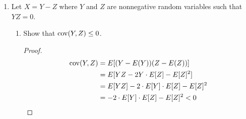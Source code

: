 \documentclass[paper=usletter, fontsize=12pt]{article}
\begin{document}
\begin{enumerate}
\begin{proof}
            Given $P(x_k=i)=p_i$ for $i=1,2,3,4,5,6$ and $k=1,2,\ldots,n$ \\ Then,
            \begin{equation*}
                X_i = \sum_{k=1}^n 1_{\{x_k=i\}}
            \end{equation*}
            Thus,
            \begin{align*}
                \cov{X_1,X_2} &= E[X_1X_2]-E[X_1]E[X_2]\\
                &= E\left[\left(\sum_{k=1}^n1_{\{x_k=1\}}\right)\left(\sum_{k=1}^n1_{\{x_k=2\}}\right)\right] - (np_1)(np_2).\\
            \end{align*}
            \endgroup
            Since, $1_{\{x_i=1\}}1_{\{x_i=2\}}=0$,\\
            then $E\left[1_{\{x_i=1\}}1_{\{x_i=2\}}\right]=0$
            \begin{align*}
                E\left[1_{\{x_i=1\}}1_{\{x_j=2\}}\right] &= P(x_i=1,x_j=2)\\
                & =P(x_i=1)P(x_j=2) \\
                &= p_1p_2, \text{for $i\ne j$}
            \end{align*}
            Therefore,
            \begin{align*}
                \cov{X_1,X_2} &= (n^2-n)p_1p_2 -n^2p_1p_2 \\
                & =-np_1p_2 <0 \qedhere
            \end{align*}

        \end{proof}

        \item Let $X=Y-Z$ where $Y$ and $Z$ are nonnegative random variables
        such that $YZ=0$.
        \begin{enumerate}

            \item Show that $\operatorname{cov}(Y,Z) \le 0$.
            \begin{proof}

                \begin{align*}
                    \operatorname{cov}(Y, Z) &= E[(Y - E(Y))(Z - E(Z))]\\
                    &=E[YZ-2Y\cdot E[Z]-E[Z]^2] \\
                    &=E[YZ]-2\cdot E[Y]\cdot E[Z]-E[Z]^2 \\
                    &=-2\cdot E[Y]\cdot E[Z]-E[Z]^2 < 0  \qedhere
                \end{align*}


\end{proof}
\end{enumerate}
\end{enumerate}
\end{document}
